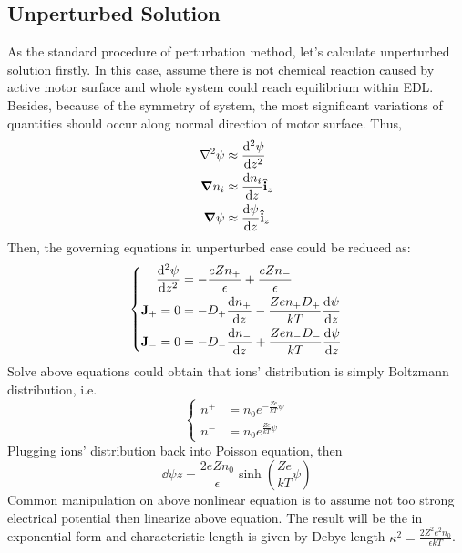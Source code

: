 \documentclass[fontsize=11pt, %
                             paper=a4, %
                             twoside, %
                             captions=tableheading,
                             index=totoc,
                             hyperref]{labbook}
\begin{document}
\begin{addmargin}[4cm]{0cm}
\subsection{Unperturbed Solution}
As the standard procedure of perturbation method, let's calculate unperturbed solution firstly. In this case, assume there is not chemical reaction caused by active motor surface and whole system could reach equilibrium within EDL. Besides, because of the symmetry of system, the most significant variations of quantities should occur along normal direction of motor surface. Thus,
\begin{equation}
\begin{aligned}
\nabla^2\psi&\approx \frac{\mathrm{d}^2 \psi}{\mathrm{d} z^2}\\
\mbox{\boldmath$ \nabla $} n_i&\approx \frac{\mathrm{d} n_i}{\mathrm{d} z}\mathbf{\hat{i}}_z\\
\mbox{\boldmath$ \nabla $} \psi&\approx \frac{\mathrm{d} \psi}{\mathrm{d} z}\mathbf{\hat{i}}_z
\end{aligned}
\end{equation}
Then, the governing equations in unperturbed case could be reduced as:
\begin{equation}
\left\{
\begin{aligned}
\frac{\mathrm{d}^2 \psi}{\mathrm{d} z^2}&=-\frac{eZ n_+}{\epsilon}+\frac{eZn_-}{\epsilon}\\
\mathbf{J}_+=0&=-D_+\frac{\mathrm{d} n_+}{\mathrm{d} z}-\frac{Z e n_+ D_+}{kT}\frac{\mathrm{d} \psi}{\mathrm{d} z}\\
\mathbf{J}_-=0&=-D_-\frac{\mathrm{d} n_-}{\mathrm{d} z}+\frac{Z e n_- D_-}{kT}\frac{\mathrm{d} \psi}{\mathrm{d} z}
\end{aligned}
\right.
\end{equation}
Solve above equations could obtain that ions' distribution is simply Boltzmann distribution, i.e.
\begin{equation}
\left\{
\begin{aligned}
n^+&=n_0e^{-\frac{Ze}{kT}\psi}\\
n^-&=n_0e^{\frac{Ze}{kT}\psi}
\end{aligned}
\right.
\end{equation}
Plugging ions' distribution back into Poisson equation, then
\begin{equation}
\dd{\psi}{z}=\frac{2eZn_0}{\epsilon}\sinh\left(\frac{Z e}{kT}\psi\right)
\end{equation}
Common manipulation on above nonlinear equation is to assume not too strong electrical potential then linearize above equation. The result will be the in exponential form and characteristic length is given by Debye length $\kappa^2=\frac{2Z^2e^2n_0}{\epsilon k T}$.

\end{addmargin}
\end{document}
